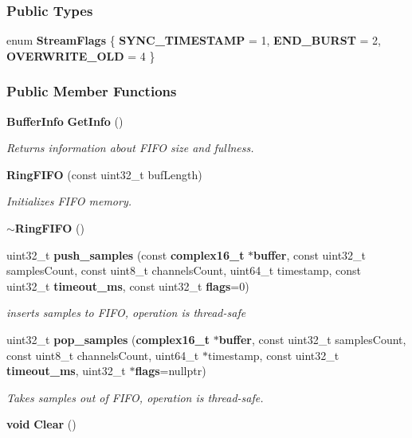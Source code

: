 \subsubsection*{Public Types}
\begin{DoxyCompactItemize}
\item 
enum {\bf Stream\+Flags} \{ {\bf S\+Y\+N\+C\+\_\+\+T\+I\+M\+E\+S\+T\+A\+MP} = 1, 
{\bf E\+N\+D\+\_\+\+B\+U\+R\+ST} = 2, 
{\bf O\+V\+E\+R\+W\+R\+I\+T\+E\+\_\+\+O\+LD} = 4
 \}
\end{DoxyCompactItemize}
\subsubsection*{Public Member Functions}
\begin{DoxyCompactItemize}
\item 
{\bf Buffer\+Info} {\bf Get\+Info} ()
\begin{DoxyCompactList}\small\item\em Returns information about F\+I\+FO size and fullness. \end{DoxyCompactList}\item 
{\bf Ring\+F\+I\+FO} (const uint32\+\_\+t buf\+Length)
\begin{DoxyCompactList}\small\item\em Initializes F\+I\+FO memory. \end{DoxyCompactList}\item 
{\bf $\sim$\+Ring\+F\+I\+FO} ()
\item 
uint32\+\_\+t {\bf push\+\_\+samples} (const {\bf complex16\+\_\+t} $\ast${\bf buffer}, const uint32\+\_\+t samples\+Count, const uint8\+\_\+t channels\+Count, uint64\+\_\+t timestamp, const uint32\+\_\+t {\bf timeout\+\_\+ms}, const uint32\+\_\+t {\bf flags}=0)
\begin{DoxyCompactList}\small\item\em inserts samples to F\+I\+FO, operation is thread-\/safe \end{DoxyCompactList}\item 
uint32\+\_\+t {\bf pop\+\_\+samples} ({\bf complex16\+\_\+t} $\ast${\bf buffer}, const uint32\+\_\+t samples\+Count, const uint8\+\_\+t channels\+Count, uint64\+\_\+t $\ast$timestamp, const uint32\+\_\+t {\bf timeout\+\_\+ms}, uint32\+\_\+t $\ast${\bf flags}=nullptr)
\begin{DoxyCompactList}\small\item\em Takes samples out of F\+I\+FO, operation is thread-\/safe. \end{DoxyCompactList}\item 
{\bf void} {\bf Clear} ()
\end{DoxyCompactItemize}
